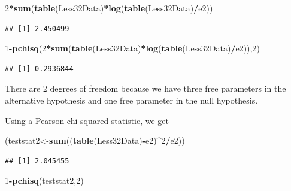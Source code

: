 \documentclass[]{book}
\newenvironment{Shaded}{\begin{snugshade}}{\end{snugshade}}
\newcommand{\KeywordTok}[1]{\textcolor[rgb]{0.13,0.29,0.53}{\textbf{#1}}}
\newcommand{\DecValTok}[1]{\textcolor[rgb]{0.00,0.00,0.81}{#1}}
\newcommand{\OperatorTok}[1]{\textcolor[rgb]{0.81,0.36,0.00}{\textbf{#1}}}
\newcommand{\NormalTok}[1]{#1}
\theoremstyle{definition}
\theoremstyle{definition}
\theoremstyle{definition}
\theoremstyle{remark}
\begin{document}
\begin{Shaded}
\begin{Highlighting}[]
\DecValTok{2}\OperatorTok{*}\KeywordTok{sum}\NormalTok{(}\KeywordTok{table}\NormalTok{(Less32Data)}\OperatorTok{*}\KeywordTok{log}\NormalTok{(}\KeywordTok{table}\NormalTok{(Less32Data)}\OperatorTok{/}\NormalTok{e2))}
\end{Highlighting}
\end{Shaded}

\begin{verbatim}
## [1] 2.450499
\end{verbatim}

\begin{Shaded}
\begin{Highlighting}[]
\DecValTok{1}\OperatorTok{-}\KeywordTok{pchisq}\NormalTok{(}\DecValTok{2}\OperatorTok{*}\KeywordTok{sum}\NormalTok{(}\KeywordTok{table}\NormalTok{(Less32Data)}\OperatorTok{*}\KeywordTok{log}\NormalTok{(}\KeywordTok{table}\NormalTok{(Less32Data)}\OperatorTok{/}\NormalTok{e2)),}\DecValTok{2}\NormalTok{)}
\end{Highlighting}
\end{Shaded}

\begin{verbatim}
## [1] 0.2936844
\end{verbatim}

There are 2 degrees of freedom because we have three free parameters in
the alternative hypothesis and one free parameter in the null
hypothesis.

Using a Pearson chi-squared statistic, we get

\begin{Shaded}
\begin{Highlighting}[]
\NormalTok{(teststat2<-}\KeywordTok{sum}\NormalTok{((}\KeywordTok{table}\NormalTok{(Less32Data)}\OperatorTok{-}\NormalTok{e2)}\OperatorTok{^}\DecValTok{2}\OperatorTok{/}\NormalTok{e2))}
\end{Highlighting}
\end{Shaded}

\begin{verbatim}
## [1] 2.045455
\end{verbatim}

\begin{Shaded}
\begin{Highlighting}[]
\DecValTok{1}\OperatorTok{-}\KeywordTok{pchisq}\NormalTok{(teststat2,}\DecValTok{2}\NormalTok{)}
\end{Highlighting}
\end{Shaded}
\end{document}
